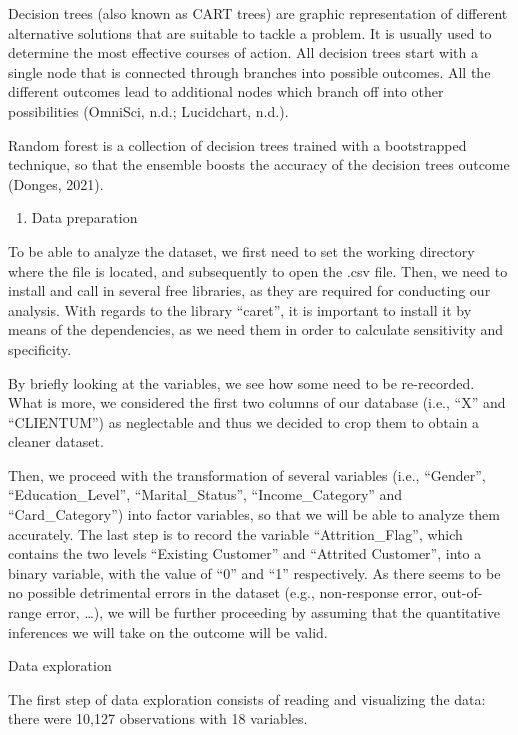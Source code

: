 \documentclass[
]{article}
\providecommand{\tightlist}{%
  \setlength{\itemsep}{0pt}\setlength{\parskip}{0pt}}
\begin{document}
Decision trees (also known as CART trees) are graphic representation of
different alternative solutions that are suitable to tackle a problem.
It is usually used to determine the most effective courses of action.
All decision trees start with a single node that is connected through
branches into possible outcomes. All the different outcomes lead to
additional nodes which branch off into other possibilities (OmniSci,
n.d.; Lucidchart, n.d.).

Random forest is a collection of decision trees trained with a
bootstrapped technique, so that the ensemble boosts the accuracy of the
decision trees outcome (Donges, 2021).

\begin{enumerate}
\def\labelenumi{\arabic{enumi}.}
\setcounter{enumi}{2}
\tightlist
\item
  Data preparation
\end{enumerate}

To be able to analyze the dataset, we first need to set the working
directory where the file is located, and subsequently to open the .csv
file. Then, we need to install and call in several free libraries, as
they are required for conducting our analysis. With regards to the
library ``caret'', it is important to install it by means of the
dependencies, as we need them in order to calculate sensitivity and
specificity.

By briefly looking at the variables, we see how some need to be
re-recorded. What is more, we considered the first two columns of our
database (i.e., ``X'' and ``CLIENTUM'') as neglectable and thus we
decided to crop them to obtain a cleaner dataset.

Then, we proceed with the transformation of several variables (i.e.,
``Gender'', ``Education\_Level'', ``Marital\_Status'',
``Income\_Category'' and ``Card\_Category'') into factor variables, so
that we will be able to analyze them accurately. The last step is to
record the variable ``Attrition\_Flag'', which contains the two levels
``Existing Customer'' and ``Attrited Customer'', into a binary variable,
with the value of ``0'' and ``1'' respectively. As there seems to be no
possible detrimental errors in the dataset (e.g., non-response error,
out-of-range error, \ldots), we will be further proceeding by assuming
that the quantitative inferences we will take on the outcome will be
valid.

Data exploration

The first step of data exploration consists of reading and visualizing
the data: there were 10,127 observations with 18 variables.
\end{document}
